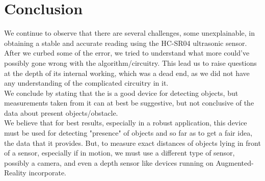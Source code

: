 \chapter{Conclusion}\label{ch:conclusion}
We continue to observe that there are several challenges, some unexplainable, in obtaining a stable and accurate reading using the HC-SR04 ultrasonic sensor. After we curbed some of the error, we tried to understand what more could've possibly gone wrong with the algorithm/circuitry. This lead us to raise questions at the depth of its internal working, which was a dead end, as we did not have any understanding of the complicated circuitry in it.\vspace{0.8cm} \\
We conclude by stating that the \hcsr{} \ultrasonic{} is a good device for detecting objects, but measurements taken from it can at best be suggestive, but not conclusive of the data about present objects/obstacle.\vspace{0.8cm} \\
We believe that for best results, especially in a robust application, this device must be used for detecting "presence" of objects and so far as to get a fair idea, the data that it provides. But, to measure exact distances of objects lying in front of a sensor, especially if in motion, we must use a different type of sensor, possibly a camera, and even a depth sensor like devices running on Augmented-Reality incorporate. \clearpage